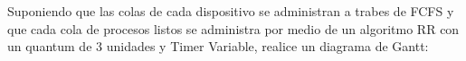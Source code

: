 \begin{questions}
Suponiendo que las colas de cada dispositivo se administran a trabes de FCFS y que cada cola de procesos listos se administra por medio de un algoritmo RR con un quantum de 3 unidades y Timer Variable, realice un diagrama de Gantt:

\end{questions}